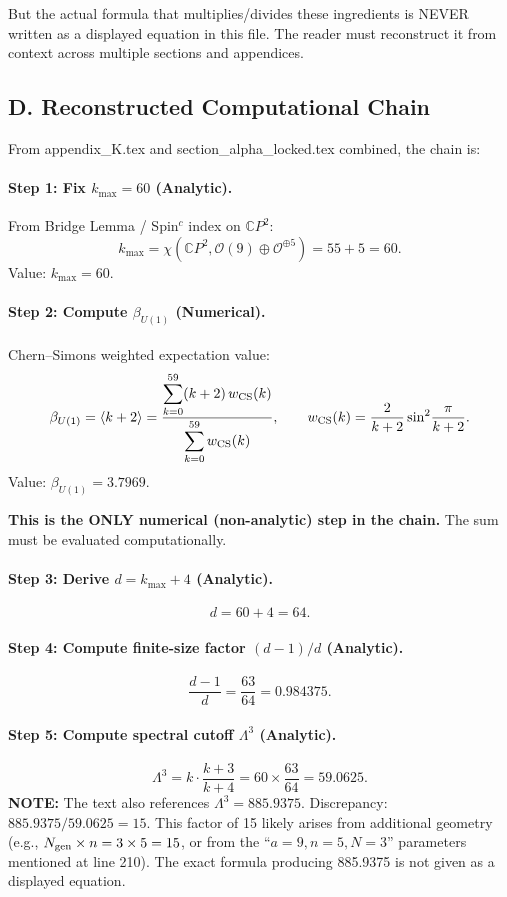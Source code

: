 But the actual formula that multiplies/divides these ingredients is NEVER written
as a displayed equation in this file. The reader must reconstruct it from context
across multiple sections and appendices.

\subsection*{D. Reconstructed Computational Chain}

From appendix\_K.tex and section\_alpha\_locked.tex combined, the chain is:

\paragraph{Step 1: Fix $k_{\max} = 60$ (Analytic).}
From Bridge Lemma / Spin$^c$ index on $\mathbb{C}P^2$:
\[
  k_{\max} = \chi(\mathbb{C}P^2, \mathcal{O}(9) \oplus \mathcal{O}^{\oplus 5})
  = 55 + 5 = 60.
\]
Value: $k_{\max} = 60$.

\paragraph{Step 2: Compute $\beta_{U(1)}$ (Numerical).}
Chern--Simons weighted expectation value:
\[
  \beta_{U(1)} = \langle k + 2 \rangle
  = \frac{\displaystyle\sum_{k=0}^{59} (k+2)\, w_{\rm CS}(k)}
         {\displaystyle\sum_{k=0}^{59} w_{\rm CS}(k)},
  \qquad
  w_{\rm CS}(k) = \frac{2}{k+2}\sin^2\!\frac{\pi}{k+2}.
\]
Value: $\beta_{U(1)} = 3.7969$.

\textbf{This is the ONLY numerical (non-analytic) step in the chain.}
The sum must be evaluated computationally.

\paragraph{Step 3: Derive $d = k_{\max} + 4$ (Analytic).}
\[
  d = 60 + 4 = 64.
\]

\paragraph{Step 4: Compute finite-size factor $(d-1)/d$ (Analytic).}
\[
  \frac{d-1}{d} = \frac{63}{64} = 0.984375.
\]

\paragraph{Step 5: Compute spectral cutoff $\Lambda^3$ (Analytic).}
\[
  \Lambda^3 = k \cdot \frac{k+3}{k+4} = 60 \times \frac{63}{64} = 59.0625.
\]
\textbf{NOTE:} The text also references $\Lambda^3 = 885.9375$.
Discrepancy: $885.9375 / 59.0625 = 15$.
This factor of 15 likely arises from additional geometry
(e.g., $N_{\rm gen} \times n = 3 \times 5 = 15$,
or from the ``$a = 9, n = 5, N = 3$'' parameters mentioned at line 210).
The exact formula producing 885.9375 is not given as a displayed equation.

